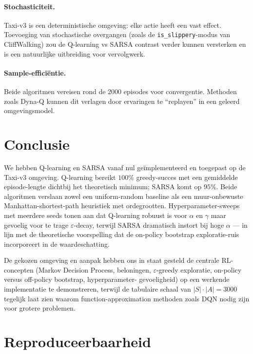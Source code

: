\documentclass[11pt,a4paper]{article}
\begin{document}
\paragraph{Stochasticiteit.} Taxi-v3 is een deterministische
omgeving: elke actie heeft een vast effect. Toevoeging van stochastische
overgangen (zoals de \texttt{is\_slippery}-modus van CliffWalking) zou
de Q-learning vs SARSA contrast verder kunnen versterken en is een
natuurlijke uitbreiding voor vervolgwerk.

\paragraph{Sample-effici\"entie.} Beide algoritmen vereisen rond de
2000 episodes voor convergentie. Methoden zoals Dyna-Q
\citep[\S 8.2]{sutton_barto_2018} kunnen dit verlagen door
ervaringen te ``replayen'' in een geleerd omgevingsmodel.

\section{Conclusie}

We hebben Q-learning en SARSA vanaf nul ge\"implementeerd en toegepast op
de Taxi-v3 omgeving. Q-learning bereikt $100\%$ greedy-succes met een
gemiddelde episode-lengte dichtbij het theoretisch minimum; SARSA komt
op $95\%$. Beide algoritmen verslaan zowel een uniform-random baseline
als een muur-onbewuste Manhattan-shortest-path heuristiek met
ordegrootten. Hyperparameter-sweeps met meerdere seeds tonen aan dat
Q-learning robuust is voor $\alpha$ en $\gamma$ maar gevoelig voor te
trage $\varepsilon$-decay, terwijl SARSA dramatisch instort bij hoge
$\alpha$ --- in lijn met de theoretische voorspelling dat de on-policy
bootstrap exploratie-ruis incorporeert in de waardeschatting.

De gekozen omgeving en aanpak hebben ons in staat gesteld de centrale
RL-concepten (Markov Decision Process, beloningen, $\varepsilon$-greedy
exploratie, on-policy versus off-policy bootstrap, hyperparameter-
gevoeligheid) op een werkende implementatie te demonstreren, terwijl
de tabulaire schaal van $|S| \cdot |A| = 3000$ tegelijk laat zien
waarom function-approximation methoden zoals DQN nodig zijn voor grotere
problemen.

\section*{Reproduceerbaarheid}
\end{document}
